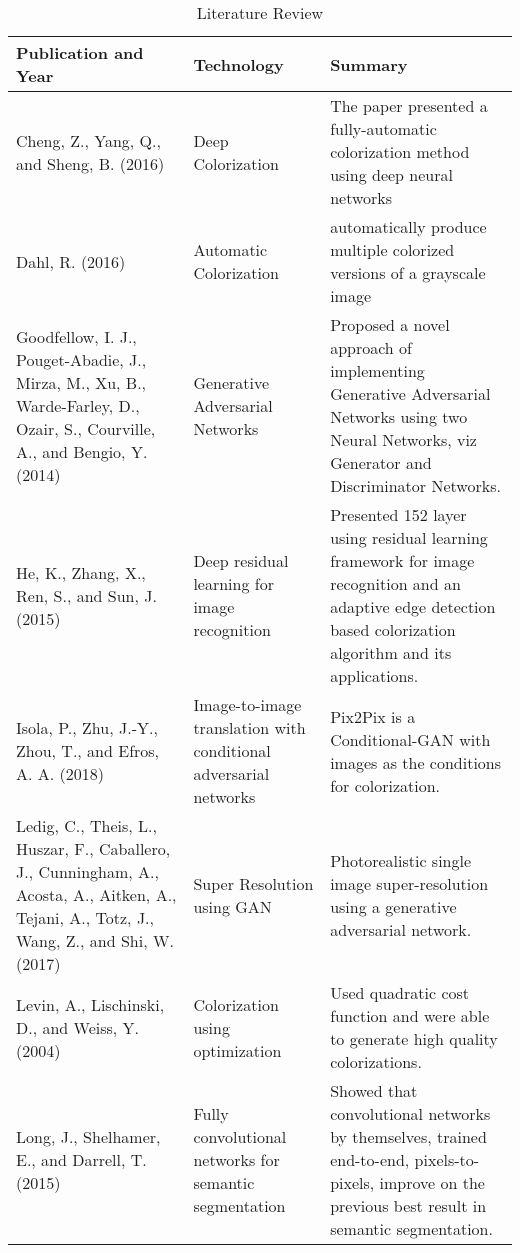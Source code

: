\begin{table}[!htbp]
\begin{center}
\def\arraystretch{1.5}
  \begin{tabularx}{\textwidth}{| X | X | X | } \hline
Publication and Year & Technology & Summary \\ \hline
Cheng, Z., Yang, Q., and Sheng, B. (2016) &	Deep Colorization &	 The paper presented a fully-automatic colorization method using deep neural networks\\ \hline

Dahl, R. (2016) &	Automatic Colorization & automatically produce multiple colorized versions of a grayscale image\\ \hline

Goodfellow, I. J., Pouget-Abadie, J., Mirza, M., Xu, B., Warde-Farley, D., Ozair, S., Courville, A., and Bengio, Y. (2014) & Generative Adversarial Networks & Proposed a novel approach of implementing Generative Adversarial Networks using two Neural Networks, viz Generator and Discriminator Networks.\\ \hline

He, K., Zhang, X., Ren, S., and Sun, J. (2015) & Deep residual learning for image recognition & Presented 152 layer using residual learning framework for image recognition and an adaptive edge detection based colorization algorithm and its applications.\\ \hline

Isola, P., Zhu, J.-Y., Zhou, T., and Efros, A. A. (2018) & Image-to-image translation with conditional adversarial networks &  Pix2Pix is a Conditional-GAN with images as the conditions for colorization.\\ \hline

Ledig, C., Theis, L., Huszar, F., Caballero, J., Cunningham, A., Acosta, A., Aitken, A., Tejani, A., Totz, J., Wang, Z., and Shi, W. (2017) &  Super Resolution using GAN & Photorealistic single image super-resolution using a generative adversarial network.\\ \hline

Levin, A., Lischinski, D., and Weiss, Y. (2004) &  Colorization using optimization & Used quadratic cost function and were able to generate high quality colorizations. \\ \hline

Long, J., Shelhamer, E., and Darrell, T. (2015) &  Fully convolutional networks for semantic segmentation &  Showed that convolutional networks by themselves, trained end-to-end, pixels-to-pixels, improve on the previous best result in semantic segmentation.\\ \hline

\end{tabularx}
\caption{Literature Review}
 \label{tab:hreq}
\end{center}

\end{table}
